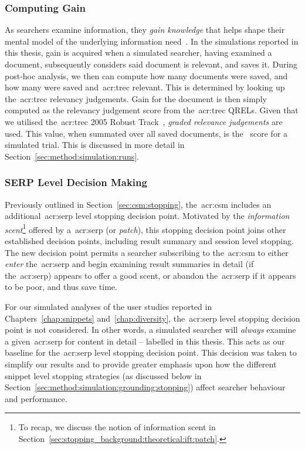 \subsubsection{Computing Gain}\label{sec:method:simulation:grounding:gain}
As searchers examine information, they \emph{gain knowledge} that helps shape their mental model of the underlying information need~\citep{nickles1995judgment}. In the simulations reported in this thesis, gain is acquired when a simulated searcher, having examined a document, subsequently considers said document is relevant, and saves it. During post-hoc analysis, we then can compute how many documents were saved, and how many were saved and~\gls{acr:trec} relevant. This is determined by looking up the~\gls{acr:trec} relevancy judgements. Gain for the document is then simply computed as the relevancy judgement score from the~\gls{acr:trec} QRELs. Given that we utilised the~\gls{acr:trec} 2005 Robust Track~\citep{voorhees2005trec_book}, \emph{graded relevance judgements} are used. This value, when summated over all saved documents, is the~ score for a simulated trial. This is discussed in more detail in Section~\ref{sec:method:simulation:runs}.

\vspace*{-2mm}
\subsubsection{SERP Level Decision Making}\label{sec:method:simulation:grounding:serp}
Previously outlined in Section~\ref{sec:csm:stopping}, the~\gls{acr:csm} includes an additional~\gls{acr:serp} level stopping decision point. Motivated by the \emph{information scent}\footnote{To recap, we discuss the notion of information scent in Section~\ref{sec:stopping_background:theoretical:ift:patch}.} offered by a~\gls{acr:serp} (or \emph{patch}), this stopping decision point joins other established decision points, including result summary and session level stopping. The new decision point permits a searcher subscribing to the~\gls{acr:csm} to either \emph{enter} the~\gls{acr:serp} and begin examining result summaries in detail (if the~\gls{acr:serp}) appears to offer a good scent, or abandon the~\gls{acr:serp} if it appears to be poor, and thus save time.

For our simulated analyses of the user studies reported in Chapters~\ref{chap:snippets} and~\ref{chap:diversity}, the~\gls{acr:serp} level stopping decision point is not considered. In other words, a simulated searcher will \emph{always} examine a given~\gls{acr:serp} for content in detail -- labelled  in this thesis. This acts as our baseline for the~\gls{acr:serp} level stopping decision point. This decision was taken to simplify our results and to provide greater emphasis upon how the different snippet level stopping strategies (as discussed below in Section~\ref{sec:method:simulation:grounding:stopping}) affect searcher behaviour and performance.

